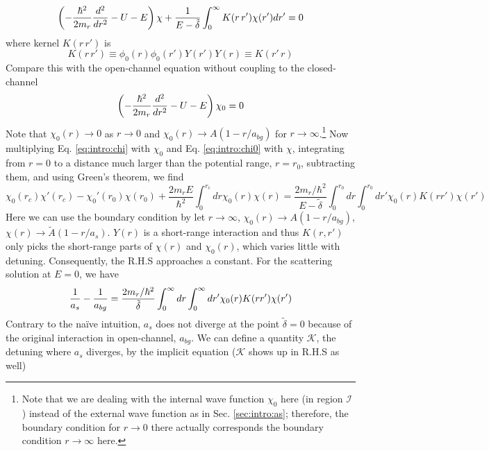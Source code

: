 \begin{equation}\label{eq:intro:chi}
\left(-\frac{\hbar^{2}}{2m_{r}}\frac{d^{2}}{dr^{2}}-U-E\right)\chi+\frac{1}{E-\tilde\delta}\int_{0}^{\infty}K(r\,r')\chi(r')dr'=0
\end{equation}
where kernel $K(r\,r')$ is
\begin{equation}
K(r\,r')\equiv\phi_{0}(r)\phi_{0}(r')Y(r')Y(r)\equiv{}K(r'\,r)
\end{equation}
Compare this with the open-channel  \sch equation without coupling to the closed-channel
\begin{equation}\label{eq:intro:chi0}
\left(-\frac{\hbar^{2}}{2m_{r}}\frac{d^{2}}{dr^{2}}-U-E\right)\chi_{0}=0
\end{equation}
Note that $\chi_{0}(r)\rightarrow0$ as $r\rightarrow0$ and $\chi_{0}(r)\rightarrow{A}(1-r/a_{bg})$ for $r\rightarrow\infty$.\footnote{Note that we are dealing with the internal wave function $\chi_{0}$ here (in region $\mathcal{I}$) instead of the external wave function as in Sec. \ref{sec:intro:as}; therefore, the boundary condition for $r\rightarrow0$ there actually corresponds the boundary condition $r\rightarrow\infty$ here.} Now multiplying Eq. \ref{eq:intro:chi} with $\chi_{0}$ and Eq. \ref{eq:intro:chi0} with $\chi$, integrating from $r=0$ to a  distance much larger than the potential range, $r=r_{0}$, subtracting them, and using Green's theorem, we find 
\begin{equation}
\chi_{0}(r_{c})\chi'(r_{c})-\chi_{0}'(r_{0})\chi(r_{0})+\frac{2m_{r}E}{\hbar^{2}}\int_{0}^{r_{c}}dr\chi_{0}(r)\chi(r)
=\frac{2m_{r}/\hbar^{2}}{E-\tilde\delta}\int_{0}^{r_{0}}dr\int_{0}^{r_{0}}dr'\chi_{0}(r)K(rr')\chi(r')
\end{equation}
Here we can use the boundary condition by let $r\rightarrow\infty$, $\chi_{0}(r)\rightarrow{A}(1-r/a_{bg})$, $\chi(r)\rightarrow\tilde{A}(1-r/a_{s})$.  $Y(r)$ is a short-range interaction and thus $K(r,r')$ only picks the short-range parts of $\chi(r)$ and $\chi_{0}(r)$, which varies little with detuning. Consequently,  the R.H.S approaches a constant.  For the scattering solution at  $E=0$, we have 
\begin{equation}
\frac{1}{a_{s}}-\frac{1}{a_{bg}}=\frac{2m_{r}/\hbar^{2}}{\tilde\delta}\int_{0}^{\infty}dr\int_{0}^{\infty}dr'\chi_{0}(r)K(rr')\chi(r')
\end{equation}
Contrary to the na\"ive intuition, $a_{s}$ does not diverge at the point $\tilde\delta=0$ because of the original interaction in open-channel, $a_{bg}$.  We can define a quantity $\mathcal{K}$, the detuning where $a_{s}$ diverges, by the implicit equation ($\mathcal{K}$ shows up in R.H.S as well)

